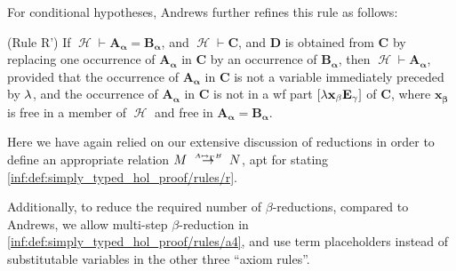 \begin{comments}
  For conditional hypotheses, Andrews further refines this rule as follows:
  \begin{displayquote}
    (Rule R') If \( \mscrH \vdash \mathbf{A_\alpha} = \mathbf{B_\alpha} \), and \( \mscrH \vdash \mathbf{C} \), and \( \mathbf{D} \) is obtained from \( \mathbf{C} \) by replacing one occurrence of \( \mathbf{A_\alpha} \) in \( \mathbf{C} \) by an occurrence of \( \mathbf{B_\alpha} \), then \( \mscrH \vdash \mathbf{A_\alpha} \), provided that the occurrence of \( \mathbf{A_\alpha} \) in \( \mathbf{C} \) is not a variable immediately preceded by \( \mathbf{{\mathrm \lambda}} \), and the occurrence of \( \mathbf{A_\alpha} \) in \( \mathbf{C} \) is not in a wf part \( [\mathbf{{\mathrm \lambda} x_\beta E_\gamma}] \) of \( \mathbf{C} \), where \( \mathbf{x_\beta} \) is free in a member of \( \mscrH \) and free in \( \mathbf{A_\alpha} = \mathbf{B_\alpha} \).
  \end{displayquote}

  Here we have again relied on our extensive discussion of reductions in order to define an appropriate relation \( M \redrel{A \mapsto_\Gamma B} N \), apt for stating \ref{inf:def:simply_typed_hol_proof/rules/r}.

  Additionally, to reduce the required number of \( \beta \)-reductions, compared to Andrews, we allow multi-step \( \beta \)-reduction in \ref{inf:def:simply_typed_hol_proof/rules/a4}, and use term placeholders instead of substitutable variables in the other three \enquote{axiom rules}.
\end{comments}

